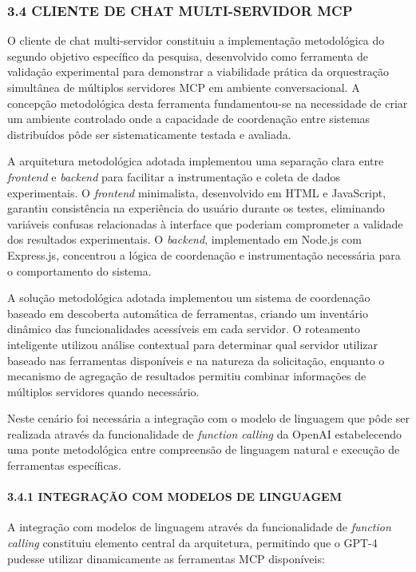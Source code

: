 \documentclass[
]{article}
\begin{document}
\subsubsection{3.4 CLIENTE DE CHAT MULTI-SERVIDOR
MCP}\label{cliente-de-chat-multi-servidor-mcp}

O cliente de chat multi-servidor constituiu a implementação metodológica
do segundo objetivo específico da pesquisa, desenvolvido como ferramenta
de validação experimental para demonstrar a viabilidade prática da
orquestração simultânea de múltiplos servidores MCP em ambiente
conversacional. A concepção metodológica desta ferramenta fundamentou-se
na necessidade de criar um ambiente controlado onde a capacidade de
coordenação entre sistemas distribuídos pôde ser sistematicamente
testada e avaliada.

A arquitetura metodológica adotada implementou uma separação clara entre
\emph{frontend} e \emph{backend} para facilitar a instrumentação e
coleta de dados experimentais. O \emph{frontend} minimalista,
desenvolvido em HTML e JavaScript, garantiu consistência na experiência
do usuário durante os testes, eliminando variáveis confusas relacionadas
à interface que poderiam comprometer a validade dos resultados
experimentais. O \emph{backend}, implementado em Node.js com Express.js,
concentrou a lógica de coordenação e instrumentação necessária para o
comportamento do sistema.

A solução metodológica adotada implementou um sistema de coordenação
baseado em descoberta automática de ferramentas, criando um inventário
dinâmico das funcionalidades acessíveis em cada servidor. O roteamento
inteligente utilizou análise contextual para determinar qual servidor
utilizar baseado nas ferramentas disponíveis e na natureza da
solicitação, enquanto o mecanismo de agregação de resultados permitiu
combinar informações de múltiplos servidores quando necessário.

Neste cenário foi necessária a integração com o modelo de linguagem que
pôde ser realizada através da funcionalidade de \emph{function calling}
da OpenAI estabelecendo uma ponte metodológica entre compreensão de
linguagem natural e execução de ferramentas específicas.

\paragraph{3.4.1 INTEGRAÇÃO COM MODELOS DE
LINGUAGEM}\label{integrauxe7uxe3o-com-modelos-de-linguagem}

A integração com modelos de linguagem através da funcionalidade de
\emph{function calling} constituiu elemento central da arquitetura,
permitindo que o GPT-4 pudesse utilizar dinamicamente as ferramentas MCP
disponíveis:
\end{document}
